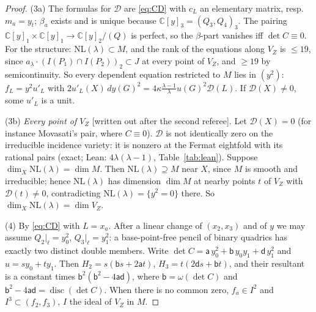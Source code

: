 \documentclass[10pt]{article}
\numberwithin{equation}{section}
\theoremstyle{remark}
\newcommand{\CC}{\mathbb{C}}
\newcommand{\NL}{\mathrm{NL}}
\newcommand{\VZ}{V_Z}
\newcommand{\cD}{\mathcal{D}}
\begin{document}
\begin{proof}
(3a) The formulas for $\cD$ are \eqref{eq:CD} with $c_L$ an elementary matrix, resp.\ $m_a=y_t$; $\beta_a$ exists
and is unique because $\CC[y]_3=(Q_3,Q_4)_3$. The pairing $\CC[y]_1\times\CC[y]_1\to\CC[y]_2/(Q)$ is perfect, so
the $\beta$-part vanishes iff $\det C\equiv0$. For the structure: $\NL(\lambda)\subset M$, and the rank of the
equations along $\VZ$ is $\le19$, since $a_\lambda\cdot(I(P_1)\cap I(P_2))_2\subset J$ at every point of $\VZ$,
and $\ge19$ by semicontinuity. So every dependent equation restricted to $M$ lies in $(y^2)$: $f_L=y^2u'_L$ with
$2u'_L(X)\,dy(G)^2=4\kappa\frac{\lambda-1}{\lambda}u(G)^2\cD(L)$. If $\cD(X)\ne0$, some $u'_L$ is a unit.

(3b) \emph{Every point of $\VZ$} [written out after the second referee]. Let $\cD(X)=0$ (for instance Movasati's
pair, where $C\equiv0$). $\cD$ is not identically zero on the irreducible incidence variety: it is nonzero at
the Fermat eightfold with its rational pairs (exact; Lean: $4\lambda(\lambda-1)$, Table~\ref{tab:lean}). Suppose
$\dim_X\NL(\lambda)=\dim M$. Then $\NL(\lambda)\supseteq M$ near $X$, since $M$ is smooth and irreducible; hence
$\NL(\lambda)$ has dimension $\dim M$ at nearby points $t$ of $\VZ$ with $\cD(t)\ne0$, contradicting
$\NL(\lambda)=\{y^2=0\}$ there. So $\dim_X\NL(\lambda)=\dim\VZ$.

(4) By \eqref{eq:CD} with $L=x_a$. After a linear change of $(x_2,x_3)$ and of $y$ we may assume
$Q_2|_\ell=y_0^2$, $Q_3|_\ell=y_1^2$: a base-point-free pencil of binary quadrics has exactly two distinct
double members. Write $\det C=\mathsf a\,y_0^2+\mathsf b\,y_0y_1+\mathsf d\,y_1^2$ and $u=sy_0+ty_1$. Then
$H_2=s(\mathsf b s+2\mathsf a t)$, $H_3=t(2\mathsf d s+\mathsf b t)$, and their resultant is a constant times
$\mathsf b^2(\mathsf b^2-4\mathsf a\mathsf d)$, where $\mathsf b=\omega(\det C)$ and $\mathsf b^2-4\mathsf
a\mathsf d=\operatorname{disc}(\det C)$. When there is no common zero, $f_a\in I^2$ and $I^3\subset(f_2,f_3)$,
$I$ the ideal of $\VZ$ in $M$.
\end{proof}
\end{document}
